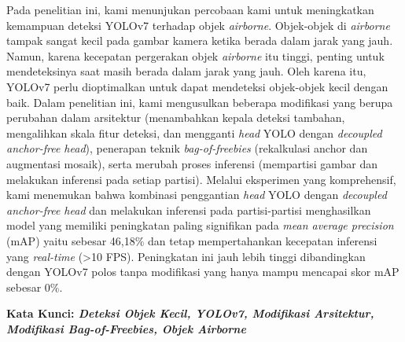 Pada penelitian ini, kami menunjukan percobaan kami untuk meningkatkan kemampuan deteksi YOLOv7 terhadap objek \emph{airborne}. 
Objek-objek di \emph{airborne} tampak sangat kecil pada gambar kamera ketika berada dalam jarak yang jauh. Namun, karena kecepatan pergerakan objek \emph{airborne} itu tinggi, penting untuk mendeteksinya saat masih berada dalam jarak yang jauh. 
Oleh karena itu, YOLOv7 perlu dioptimalkan untuk dapat mendeteksi objek-objek kecil dengan baik. 
Dalam penelitian ini, kami mengusulkan beberapa modifikasi yang berupa perubahan dalam arsitektur (menambahkan kepala deteksi tambahan, mengalihkan skala fitur deteksi, dan mengganti \emph{head} YOLO dengan \emph{decoupled anchor-free head}), penerapan teknik \emph{bag-of-freebies} (rekalkulasi anchor dan augmentasi mosaik), serta merubah proses inferensi (mempartisi gambar dan melakukan inferensi pada setiap partisi). 
Melalui eksperimen yang komprehensif, kami menemukan bahwa kombinasi penggantian \emph{head} YOLO dengan \emph{decoupled anchor-free head} dan melakukan inferensi pada partisi-partisi menghasilkan model yang memiliki peningkatan paling signifikan pada \emph{mean average precision} (mAP) yaitu sebesar 46,18\% dan tetap mempertahankan kecepatan inferensi yang \emph{real-time} (>10 FPS). 
Peningkatan ini jauh lebih tinggi dibandingkan dengan YOLOv7 polos tanpa modifikasi yang hanya mampu mencapai skor mAP sebesar 0\%.

\noindent
\textbf{Kata Kunci: \emph{Deteksi Objek Kecil, YOLOv7, Modifikasi Arsitektur, Modifikasi Bag-of-Freebies, Objek Airborne}}
